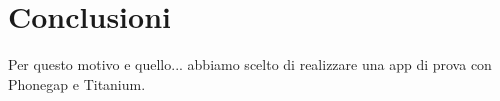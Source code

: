 \section{Conclusioni}
		Per questo motivo e quello... abbiamo scelto di realizzare una app di 
		prova con Phonegap e Titanium.